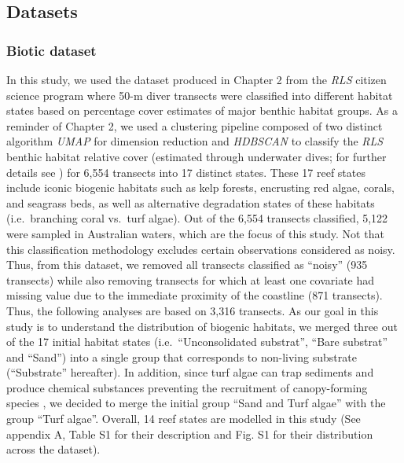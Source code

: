 \begin{refsection}
{\subsection{Datasets}\label{datasets}}

\hypertarget{biotic-dataset}{%
\subsubsection{Biotic dataset}\label{biotic-dataset}}

In this study, we used the dataset produced in Chapter 2 from the
\emph{RLS} citizen science program where 50-m diver transects were
classified into different habitat states based on percentage cover
estimates of major benthic habitat groups. As a reminder of Chapter 2,
we used a clustering pipeline composed of two distinct algorithm
\emph{UMAP} \autocite{McInnes_2020} for dimension reduction and
\emph{HDBSCAN} \autocites[ ]{Moulavi_2014}{McInnes2017} to classify the
\emph{RLS} benthic habitat relative cover (estimated through underwater
dives; for further details see \textcite{Edgar_2014}) for 6,554
transects into 17 distinct states. These 17 reef states include iconic
biogenic habitats such as kelp forests, encrusting red algae, corals,
and seagrass beds, as well as alternative degradation states of these
habitats (i.e.~branching coral vs.~turf algae). Out of the 6,554
transects classified, 5,122 were sampled in Australian waters, which are
the focus of this study. Not that this classification methodology
excludes certain observations considered as noisy. Thus, from this
dataset, we removed all transects classified as ``noisy'' (935
transects) while also removing transects for which at least one
covariate had missing value due to the immediate proximity of the
coastline (871 transects). Thus, the following analyses are based on
3,316 transects. As our goal in this study is to understand the
distribution of biogenic habitats, we merged three out of the 17 initial
habitat states (i.e.~``Unconsolidated substrat'', ``Bare substrat'' and
``Sand'') into a single group that corresponds to non-living substrate
(``Substrate'' hereafter). In addition, since turf algae can trap
sediments and produce chemical substances preventing the recruitment of
canopy-forming species \autocite{Burek_2018}, we decided to merge the
initial group ``Sand and Turf algae'' with the group ``Turf algae''.
Overall, 14 reef states are modelled in this study (See appendix A,
Table S1 for their description and Fig. S1 for their distribution across
the dataset).


\end{refsection}
